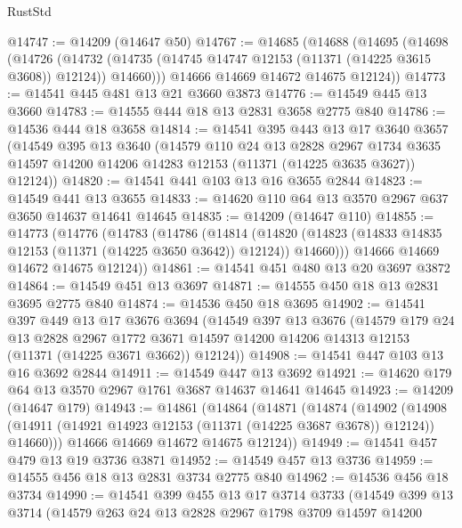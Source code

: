 \begin{lexlean}{RustStd}
\begin{coremodule}
{\begin{coremodule}
{{{{{{{{{{{{{{{{{{{{{{{{{{{{{{{{{@14747 := @14209 (@14647 @50)
@14767 := @14685
    (@14688
      (@14695
        (@14698
          (@14726
            (@14732 (@14735 (@14745 @14747 @12153 (@11371 (@14225 @3615 @3608)) @12124)) @14660)))
        @14666
        @14669
        @14672
        @14675
        @12124))
@14773 := @14541 @445 @481 @13 @21 @3660 @3873
@14776 := @14549 @445 @13 @3660
@14783 := @14555 @444 @18 @13 @2831 @3658 @2775 @840
@14786 := @14536 @444 @18 @3658
@14814 := @14541
    @395
    @443
    @13
    @17
    @3640
    @3657
    (@14549
      @395
      @13
      @3640
      (@14579
        @110
        @24
        @13
        @2828
        @2967
        @1734
        @3635
        @14597
        @14200
        @14206
        @14283
        @12153
        (@11371 (@14225 @3635 @3627))
        @12124))
@14820 := @14541 @441 @103 @13 @16 @3655 @2844
@14823 := @14549 @441 @13 @3655
@14833 := @14620 @110 @64 @13 @3570 @2967 @637 @3650 @14637 @14641 @14645
@14835 := @14209 (@14647 @110)
@14855 := @14773
    (@14776
      (@14783
        (@14786
          (@14814
            (@14820 (@14823 (@14833 @14835 @12153 (@11371 (@14225 @3650 @3642)) @12124)) @14660)))
        @14666
        @14669
        @14672
        @14675
        @12124))
@14861 := @14541 @451 @480 @13 @20 @3697 @3872
@14864 := @14549 @451 @13 @3697
@14871 := @14555 @450 @18 @13 @2831 @3695 @2775 @840
@14874 := @14536 @450 @18 @3695
@14902 := @14541
    @397
    @449
    @13
    @17
    @3676
    @3694
    (@14549
      @397
      @13
      @3676
      (@14579
        @179
        @24
        @13
        @2828
        @2967
        @1772
        @3671
        @14597
        @14200
        @14206
        @14313
        @12153
        (@11371 (@14225 @3671 @3662))
        @12124))
@14908 := @14541 @447 @103 @13 @16 @3692 @2844
@14911 := @14549 @447 @13 @3692
@14921 := @14620 @179 @64 @13 @3570 @2967 @1761 @3687 @14637 @14641 @14645
@14923 := @14209 (@14647 @179)
@14943 := @14861
    (@14864
      (@14871
        (@14874
          (@14902
            (@14908 (@14911 (@14921 @14923 @12153 (@11371 (@14225 @3687 @3678)) @12124)) @14660)))
        @14666
        @14669
        @14672
        @14675
        @12124))
@14949 := @14541 @457 @479 @13 @19 @3736 @3871
@14952 := @14549 @457 @13 @3736
@14959 := @14555 @456 @18 @13 @2831 @3734 @2775 @840
@14962 := @14536 @456 @18 @3734
@14990 := @14541
    @399
    @455
    @13
    @17
    @3714
    @3733
    (@14549
      @399
      @13
      @3714
      (@14579
        @263
        @24
        @13
        @2828
        @2967
        @1798
        @3709
        @14597
        @14200
}}}}}}}}}}}}}}}}}}}}}}}}}}}}}}}}}
\end{coremodule}}
\end{coremodule}
\end{lexlean}
